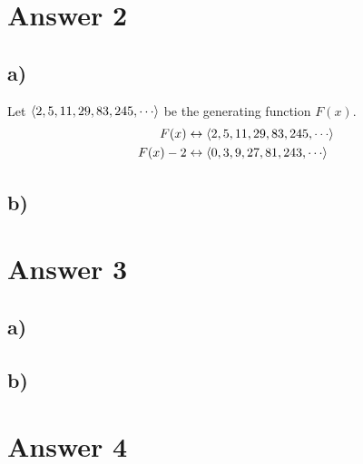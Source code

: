 \documentclass[12pt]{article}
\begin{document}
\section*{Answer 2}
\subsection*{a) }
Let $\Braket{2, 5, 11, 29, 83, 245, \cdots}$ be the generating function $F(x)$.
\begin{align*}
F(x) &\leftrightarrow \Braket{2, 5, 11, 29, 83, 245, \cdots} \\
F(x) - 2 &\leftrightarrow \Braket{0, 3, 9, 27, 81, 243, \cdots} \\
\end{align*}

\subsection*{b) }

\section*{Answer 3}
\subsection*{a) }

\subsection*{b) }

\section*{Answer 4}
\end{document}
